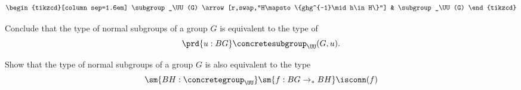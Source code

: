 \begin{exercises}
\begin{subexenum}
\begin{equation*}
\begin{tikzcd}[column sep=1.6em]
        \subgroup_\UU(G) \arrow[r,swap,"H\mapsto\{ghg^{-1}\mid h\in H\}"] & \subgroup_\UU(G)
      \end{tikzcd}
    \end{equation*}
  \item Conclude that the type of normal subgroups of a group $G$ is equivalent to the type of 
    \begin{equation*}
      \prd{u:BG}\concretesubgroup_\UU(G,u).
    \end{equation*}
  \item Show that the type of normal subgroups of a group $G$ is also equivalent to the type
    \begin{equation*}
      \sm{BH:\concretegroup_\UU}\sm{f:BG\to_\ast BH}\isconn(f)
    \end{equation*}
  \end{subexenum}
\end{exercises}

